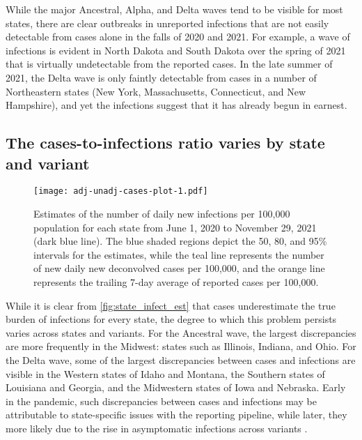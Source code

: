While the major Ancestral, Alpha, and Delta waves tend to be visible for most
states, there are clear outbreaks in unreported infections that are not easily
detectable from cases alone in the falls of 2020 and 2021. For example, a wave 
of infections is evident in North Dakota and South Dakota over the spring of 2021
that is virtually undetectable from the reported cases. In the late summer of 2021, the
Delta wave is only faintly detectable from cases in a number of Northeastern
states (New York, Massachusetts, Connecticut, and New Hampshire), and yet
the infections suggest that it has already begun in earnest. 

\subsection{The cases-to-infections ratio varies by state and variant}
\label{sec:case-infection-ratio}

\begin{figure}[!tb]
\centering
\texttt{[image: adj-unadj-cases-plot-1.pdf]} 
\caption{Estimates of the number of daily new infections per 100,000
population for each \US state from June 1, 2020 to November 29, 2021
(dark blue line). The blue shaded regions depict the 50, 80, and 95\%
intervals for the estimates, while the teal line represents
the number of new daily new deconvolved cases per 100,000, and the
orange line represents the trailing 7-day average of reported cases per
100,000.}
\label{fig:state_infect_est}
\end{figure}    

While it is clear from \autoref{fig:state_infect_est} that cases underestimate
the true burden of infections for every state, the degree to which this problem
persists varies across states and variants. 
For the Ancestral wave, the largest
discrepancies are more frequently in the Midwest: states such as Illinois,
Indiana, and Ohio. 
For the Delta wave, some of the
largest discrepancies between cases and infections are visible in the Western
states of Idaho and Montana, the Southern states of Louisiana and Georgia, and
the Midwestern states of Iowa and Nebraska. 
Early in the pandemic, such discrepancies between cases and
infections may be attributable to state-specific issues with the reporting
pipeline, while later, they more likely due to the rise in asymptomatic
infections across variants \citep{oph2022covid, garrett2022high}. 

